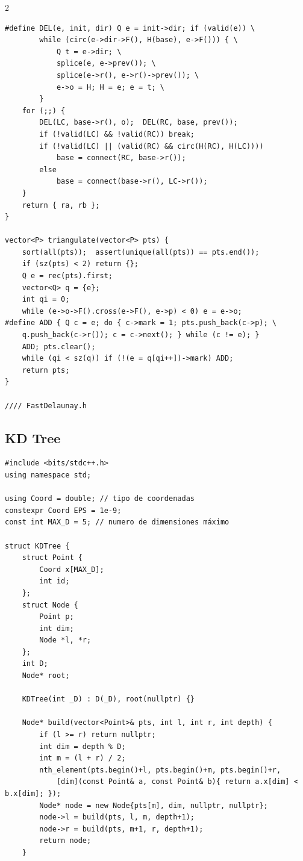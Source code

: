 \documentclass[twoside]{article}
\begin{document}
\begin{multicols*}{2}
\begin{verbatim}
#define DEL(e, init, dir) Q e = init->dir; if (valid(e)) \
		while (circ(e->dir->F(), H(base), e->F())) { \
			Q t = e->dir; \
			splice(e, e->prev()); \
			splice(e->r(), e->r()->prev()); \
			e->o = H; H = e; e = t; \
		}
	for (;;) {
		DEL(LC, base->r(), o);  DEL(RC, base, prev());
		if (!valid(LC) && !valid(RC)) break;
		if (!valid(LC) || (valid(RC) && circ(H(RC), H(LC))))
			base = connect(RC, base->r());
		else
			base = connect(base->r(), LC->r());
	}
	return { ra, rb };
}

vector<P> triangulate(vector<P> pts) {
	sort(all(pts));  assert(unique(all(pts)) == pts.end());
	if (sz(pts) < 2) return {};
	Q e = rec(pts).first;
	vector<Q> q = {e};
	int qi = 0;
	while (e->o->F().cross(e->F(), e->p) < 0) e = e->o;
#define ADD { Q c = e; do { c->mark = 1; pts.push_back(c->p); \
	q.push_back(c->r()); c = c->next(); } while (c != e); }
	ADD; pts.clear();
	while (qi < sz(q)) if (!(e = q[qi++])->mark) ADD;
	return pts;
}

//// FastDelaunay.h

\end{verbatim}

	{
		\subsection*{KD Tree}
	}
	\begin{verbatim}
#include <bits/stdc++.h>
using namespace std;

using Coord = double; // tipo de coordenadas
constexpr Coord EPS = 1e-9;
const int MAX_D = 5; // numero de dimensiones máximo

struct KDTree {
    struct Point {
        Coord x[MAX_D];
        int id;
    };
    struct Node {
        Point p;
        int dim;
        Node *l, *r;
    };
    int D;
    Node* root;

    KDTree(int _D) : D(_D), root(nullptr) {}

    Node* build(vector<Point>& pts, int l, int r, int depth) {
        if (l >= r) return nullptr;
        int dim = depth % D;
        int m = (l + r) / 2;
        nth_element(pts.begin()+l, pts.begin()+m, pts.begin()+r,
            [dim](const Point& a, const Point& b){ return a.x[dim] < b.x[dim]; });
        Node* node = new Node{pts[m], dim, nullptr, nullptr};
        node->l = build(pts, l, m, depth+1);
        node->r = build(pts, m+1, r, depth+1);
        return node;
    }


\end{verbatim}
\end{multicols*}
\end{document}
